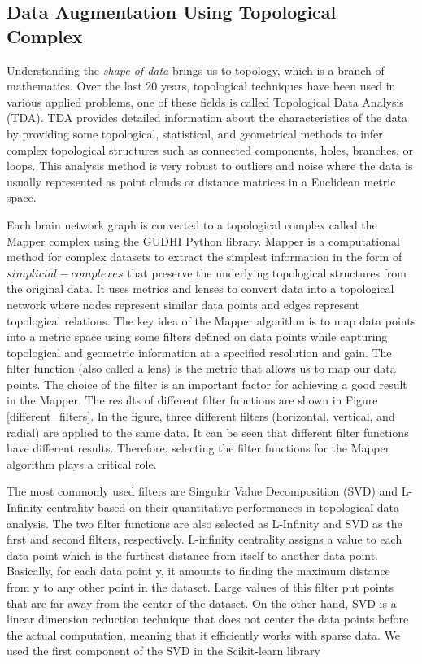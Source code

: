 \documentclass[runningheads]{llncs}
\begin{document}
\subsection{Data Augmentation Using Topological Complex}
Understanding the \textit{shape of data} brings us to topology, which is a branch of mathematics. Over the last 20 years, topological techniques have been used in various applied problems, one of these fields is called Topological Data Analysis (TDA). TDA provides detailed information about the characteristics of the data by providing some topological, statistical, and geometrical methods to infer complex topological structures such as connected components, holes, branches, or loops. This analysis method is very robust to outliers and noise where the data is usually represented as point clouds or distance matrices in a Euclidean metric space.

Each brain network graph is converted to a topological complex called the Mapper complex using the GUDHI Python library\cite{gudhi}. Mapper is a computational method for complex datasets to extract the simplest information in the form of $simplicial-complexes$ that preserve the underlying topological structures from the original data. It uses metrics and lenses to convert data into a topological network where nodes represent similar data points and edges represent topological relations. The key idea of the Mapper algorithm is to map data points into a metric space using some filters defined on data points while capturing topological and geometric information at a specified resolution and gain. The filter function (also called a lens) is the metric that allows us to map our data points. The choice of the filter is an important factor for achieving a good result in the Mapper. The results of different filter functions are shown in Figure \ref{different_filters}. In the figure, three different filters (horizontal, vertical, and radial) are applied to the same data. It can be seen that different filter functions have different results.  Therefore, selecting the filter functions for the Mapper algorithm plays a critical role.

The most commonly used filters are Singular Value Decomposition (SVD) and L-Infinity centrality based on their quantitative performances in topological data analysis\cite{nielson2015topological, lum2013extracting, banerjee2017microbial}. The two filter functions are also selected as L-Infinity and SVD as the first and second filters, respectively. L-infinity centrality assigns a value to each data point which is the furthest distance from itself to another data point. Basically, for each data point y, it amounts to finding the maximum distance from y to any other point in the dataset. Large values of this filter put points that are far away from the center of the dataset. On the other hand, SVD is a linear dimension reduction technique that does not center the data points before the actual computation, meaning that it efficiently works with sparse data. We used the first component of the SVD in the Scikit-learn library\cite{SVD}
\end{document}
